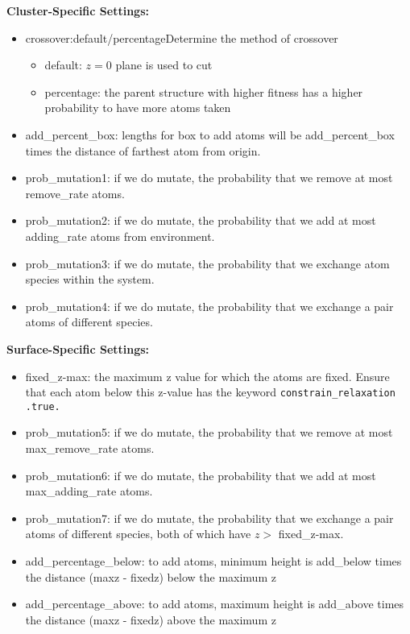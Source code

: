 \textbf{Cluster-Specific Settings:}
\begin{itemize}

\item crossover:default/percentage\newline Determine the method of crossover
\begin{itemize}
 \item default: $z = 0$ plane is used to cut
 \item percentage: the parent structure with higher fitness has a higher probability to have more atoms taken
\end{itemize}

\item add\_percent\_box: lengths for box to add atoms will be add\_percent\_box times the distance of farthest atom from origin.

\item prob\_mutation1: if we do mutate, the probability that we remove at most remove\_rate atoms.

\item prob\_mutation2: if we do mutate, the probability that we add at most adding\_rate atoms from environment.

\item prob\_mutation3: if we do mutate, the probability that we exchange atom species within the system.

\item prob\_mutation4: if we do mutate, the probability that we exchange a pair atoms of different species.

\end{itemize}

\textbf{Surface-Specific Settings:}
\begin{itemize}

\item fixed\_z-max: the maximum z value for which the atoms are fixed. Ensure that each atom below this z-value has the keyword \texttt{constrain\_relaxation \hspace{7 mm}    .true.}

\item prob\_mutation5: if we do mutate, the probability that we remove at most max\_remove\_rate atoms.

\item prob\_mutation6: if we do mutate, the probability that we add at most max\_adding\_rate atoms.

\item prob\_mutation7: if we do mutate, the probability that we exchange a pair atoms of different species, both of which have $z >$ fixed\_z-max.

\item add\_percentage\_below: to add atoms, minimum height is add\_below times the distance (maxz - fixedz) below the maximum z

\item add\_percentage\_above: to add atoms, maximum height is add\_above times the distance (maxz - fixedz) above the maximum z

\end{itemize}


